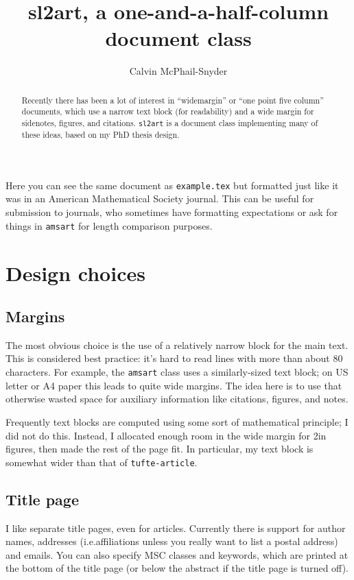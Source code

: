 \documentclass{sl2ams}
\title{sl2art, a one-and-a-half-column document class}
\author{Calvin McPhail-Snyder}
\begin{document}
\begin{abstract}
  Recently there has been a lot of interest in ``widemargin'' or ``one point five column'' documents, which use a narrow text block (for readability) and a wide margin for sidenotes, figures, and citations.
\texttt{sl2art} is a document class implementing many of these ideas, based on my PhD thesis design.
\end{abstract}

\maketitle
\tableofcontents

Here you can see the same document as \texttt{example.tex} but formatted just like it was in an American Mathematical Society journal.
This can be useful for submission to journals, who sometimes have formatting expectations or ask for things in \texttt{amsart} for length comparison purposes.

\section{Design choices}

\subsection{Margins}
The most obvious choice is the use of a relatively narrow block for the main text.
This is considered best practice: it's hard to read lines with more than about 80 characters.
For example, the \texttt{amsart} class uses a similarly-sized text block; on US letter or A4 paper this leads to quite wide margins.
The idea here is to use that otherwise wasted space for auxiliary information like citations, figures, and notes.

Frequently text blocks are computed using some sort of mathematical principle; I did not do this.
Instead, I allocated enough room in the wide margin for 2in figures, then made the rest of the page fit.
In particular, my text block is somewhat wider than that of \texttt{tufte-article}.

\subsection{Title page}
I like separate title pages, even for articles.
Currently there is support for author names, addresses (i.e.\@ affiliations unless you really want to list a postal address) and emails.
You can also specify MSC classes and keywords, which are printed at the bottom of the title page (or below the abstract if the title page is turned off).
\end{document}
